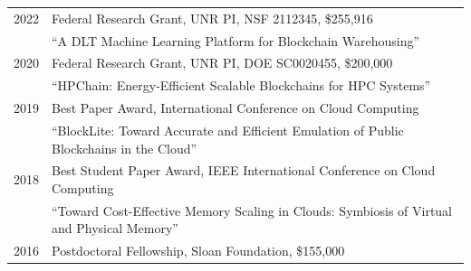 \documentclass[11pt,]{scrartcl}
\newcommand{\arygap}{.9}
\begin{document}
\begin{table}[!h]
{\def\arraystretch{\arygap5}\tabcolsep=0pt
\begin{tabular}{p{0.07\linewidth}p{0.95\linewidth}}

  
  
  
  2022 & Federal Research Grant, UNR PI, NSF 2112345, \$255,916 \\
    & ``A DLT Machine Learning Platform for Blockchain Warehousing'' \\
    
  2020 & Federal Research Grant, UNR PI, DOE SC0020455, \$200,000 \\
    & ``HPChain: Energy-Efficient Scalable Blockchains for HPC Systems'' \\
    
  2019 & Best Paper Award, International Conference on Cloud Computing \\
    & ``BlockLite: Toward Accurate and Efficient Emulation of Public Blockchains in the Cloud'' \\

    
  2018 & Best Student Paper Award, IEEE International Conference on Cloud Computing \\
    & ``Toward Cost-Effective Memory Scaling in Clouds: Symbiosis of Virtual and Physical Memory'' \\    
    
   2016 & Postdoctoral Fellowship, Sloan Foundation, \$155,000\\
\end{tabular}%
}
\end{table}
\end{document}
